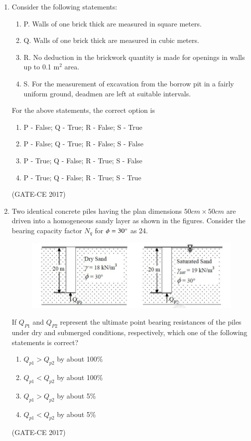 \documentclass[journal,12pt,onecolumn]{article}
\theoremstyle{remark}
\begin{document}
\begin{enumerate}
    \item Consider the following statements:
    \begin{enumerate}
        \item P. Walls of one brick thick are measured in square meters. 
        \item Q. Walls of one brick thick are measured in cubic meters.  
        \item R. No deduction in the brickwork quantity is made for openings in walls up to 0.1 m$^2$ area.  
        \item S. For the measurement of excavation from the borrow pit in a fairly uniform ground, deadmen are left at suitable intervals.
    \end{enumerate}
    For the above statements, the correct option is
    \begin{enumerate}
        \item P - False; Q - True; R - False; S - True  
        \item P - False; Q - True; R - False; S - False  
        \item P - True; Q - False; R - True; S - False  
        \item P - True; Q - False; R - True; S - True  
    \end{enumerate}
    \hfill (GATE-CE 2017)

    \item Two identical concrete piles having the plan dimensions $ 50cm \times 50cm $ are driven into a homogeneous sandy layer as shown in the figures. Consider the bearing capacity factor $ N_q $ for $ \phi = 30\degree $ as 24.
    \begin{figure}[H]
    \centering
    \includegraphics[width=0.7\columnwidth]{q34.jpg}  
    \caption{}
    \label{fig:9}
    \end{figure}
    If $ Q_{P1} $ and $ Q_{P2} $ represent the ultimate point bearing resistances of the piles under dry and submerged conditions, respectively, which one of the following statements is correct?
    \begin{enumerate}
        \item $ Q_{p1} > Q_{p2} $ by about 100\%  
        \item $ Q_{p1} < Q_{p2} $ by about 100\%  
        \item $ Q_{p1} > Q_{p2} $ by about 5\%  
        \item $ Q_{p1} < Q_{p2} $ by about 5\%  
    \end{enumerate}
    \hfill (GATE-CE 2017)


\end{enumerate}
\end{document}

